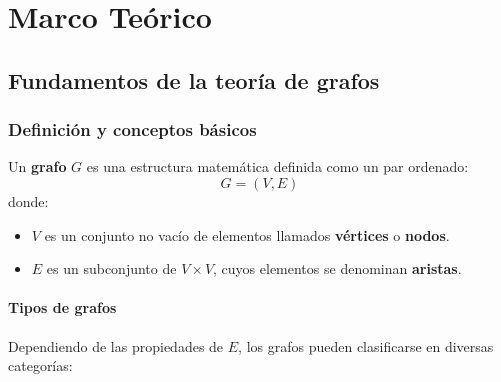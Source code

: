 \documentclass[openany]{book}
\begin{document}
\chapter{Marco Teórico}
	\section{Fundamentos de la teoría de grafos}
	
		\subsection{Definición y conceptos básicos}

			Un \textbf{grafo} $G$ es una estructura matemática definida como un par ordenado:
			\begin{equation}
				G = (V, E)
			\end{equation}
			donde:
			\begin{itemize}
				\item $V$ es un conjunto no vacío de elementos llamados \textbf{vértices} o \textbf{nodos}.
				\item $E$ es un subconjunto de $V \times V$, cuyos elementos se denominan \textbf{aristas}.
			\end{itemize}
			
				\subsubsection{Tipos de grafos}
				
				Dependiendo de las propiedades de $E$, los grafos pueden clasificarse en diversas categorías:
				
\end{document}
